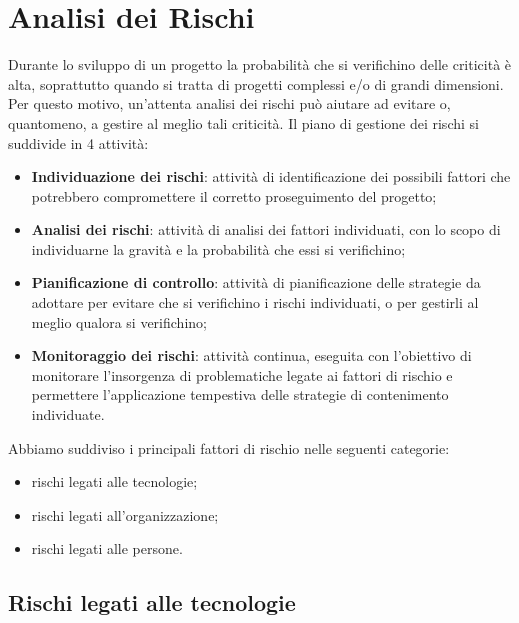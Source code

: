 \section{Analisi dei Rischi}
Durante lo sviluppo di un progetto la probabilità che si verifichino delle criticità è alta, 
soprattutto quando si tratta di progetti complessi e/o di grandi dimensioni. Per questo motivo,
un'attenta analisi dei rischi può aiutare ad evitare o, quantomeno, a gestire al meglio tali criticità.
Il piano di gestione dei rischi si suddivide in 4 attività:
\begin{itemize}
    \item \textbf{Individuazione dei rischi}: attività di identificazione dei possibili fattori che potrebbero compromettere il corretto proseguimento del progetto;
    \item \textbf{Analisi dei rischi}: attività di analisi dei fattori individuati, con lo scopo di individuarne la gravità e la probabilità che essi si verifichino;
    \item \textbf{Pianificazione di controllo}: attività di pianificazione delle strategie da adottare per evitare che si verifichino i rischi individuati, o per gestirli al meglio qualora si verifichino;
    \item \textbf{Monitoraggio dei rischi}: attività continua, eseguita con l'obiettivo di monitorare l'insorgenza di problematiche legate ai fattori di rischio e permettere l'applicazione tempestiva delle strategie di contenimento individuate.
\end{itemize}
Abbiamo suddiviso i principali fattori di rischio nelle seguenti categorie:
\begin{itemize}
    \item rischi legati alle tecnologie;
    \item rischi legati all'organizzazione;
    \item rischi legati alle persone.
\end{itemize}

\subsection{Rischi legati alle tecnologie}



